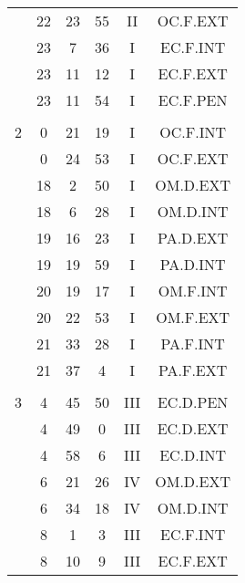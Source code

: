 \documentclass[12pt, a4paper]{article}
\begin{document}
\begin{multicols}{3}
{\begin{tabular}{c c c c c c}
	 	 	 	 & 22 & 23 & 55 & II & OC.F.EXT\\%
	 	 	 	 & 23 & 7 & 36 & I & EC.F.INT\\%
	 	 	 	 & 23 & 11 & 12 & I & EC.F.EXT\\%
	 	 	 	 & 23 & 11 & 54 & I & EC.F.PEN\\%
	 	 	 	 & & & & & \\%
	 	 	 	2 & 0 & 21 & 19 & I & OC.F.INT\\%
	 	 	 	 & 0 & 24 & 53 & I & OC.F.EXT\\%
	 	 	 	 & 18 & 2 & 50 & I & OM.D.EXT\\%
	 	 	 	 & 18 & 6 & 28 & I & OM.D.INT\\%
	 	 	 	 & 19 & 16 & 23 & I & PA.D.EXT\\%
	 	 	 	 & 19 & 19 & 59 & I & PA.D.INT\\%
	 	 	 	 & 20 & 19 & 17 & I & OM.F.INT\\%
	 	 	 	 & 20 & 22 & 53 & I & OM.F.EXT\\%
	 	 	 	 & 21 & 33 & 28 & I & PA.F.INT\\%
	 	 	 	 & 21 & 37 & 4 & I & PA.F.EXT\\%
	 	 	 	 & & & & & \\%
	 	 	 	3 & 4 & 45 & 50 & III & EC.D.PEN\\%
	 	 	 	 & 4 & 49 & 0 & III & EC.D.EXT\\%
	 	 	 	 & 4 & 58 & 6 & III & EC.D.INT\\%
	 	 	 	 & 6 & 21 & 26 & IV & OM.D.EXT\\%
	 	 	 	 & 6 & 34 & 18 & IV & OM.D.INT\\%
	 	 	 	 & 8 & 1 & 3 & III & EC.F.INT\\%
	 	 	 	 & 8 & 10 & 9 & III & EC.F.EXT\\%

\end{tabular}}
\end{multicols}
\end{document}

